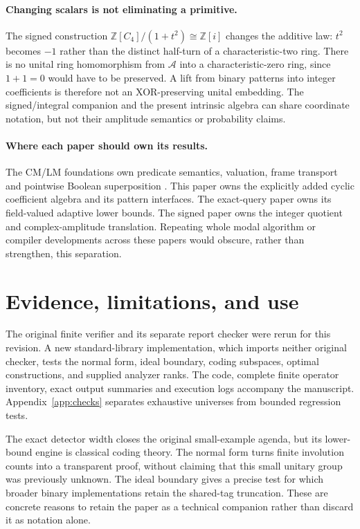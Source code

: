 \documentclass[11pt,a4paper]{article}
\theoremstyle{definition}\newtheorem{definition}[theorem]{Definition}
\theoremstyle{remark}\newtheorem{remark}[theorem]{Remark}
\newcommand{\A}{\mathcal A}
\numberwithin{equation}{section}
\begin{document}
\paragraph{Changing scalars is not eliminating a primitive.}
The signed construction $\mathbb Z[C_4]/(1+t^2)\cong\mathbb Z[i]$ changes the additive law: $t^2$ becomes $-1$ rather than the distinct half-turn of a characteristic-two ring. There is no unital ring homomorphism from $\A$ into a characteristic-zero ring, since $1+1=0$ would have to be preserved. A lift from binary patterns into integer coefficients is therefore not an XOR-preserving unital embedding. The signed/integral companion \cite{SignedCompanion} and the present intrinsic algebra can share coordinate notation, but not their amplitude semantics or probability claims.

\paragraph{Where each paper should own its results.}
The CM/LM foundations own predicate semantics, valuation, frame transport and pointwise Boolean superposition \cite{LMCompanion}. This paper owns the explicitly added cyclic coefficient algebra and its pattern interfaces. The exact-query paper owns its field-valued adaptive lower bounds. The signed paper owns the integer quotient and complex-amplitude translation. Repeating whole modal algorithm or compiler developments across these papers would obscure, rather than strengthen, this separation.

\section{Evidence, limitations, and use}\label{sec:evidence}
The original finite verifier and its separate report checker were rerun for this revision. A new standard-library implementation, which imports neither original checker, tests the normal form, ideal boundary, coding subspaces, optimal constructions, and supplied analyzer ranks. The code, complete finite operator inventory, exact output summaries and execution logs accompany the manuscript. Appendix~\ref{app:checks} separates exhaustive universes from bounded regression tests.

The exact detector width closes the original small-example agenda, but its lower-bound engine is classical coding theory. The normal form turns finite involution counts into a transparent proof, without claiming that this small unitary group was previously unknown. The ideal boundary gives a precise test for which broader binary implementations retain the shared-tag truncation. These are concrete reasons to retain the paper as a technical companion rather than discard it as notation alone.
\end{document}
